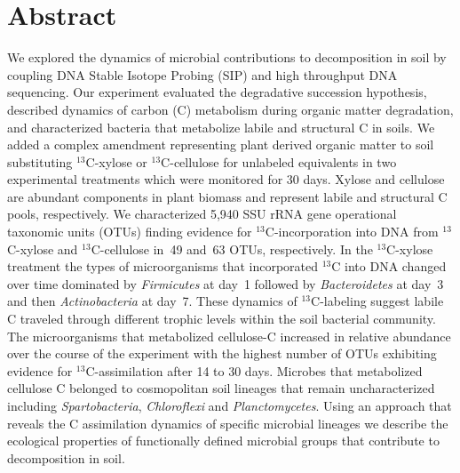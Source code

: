 \section{Abstract} We explored the dynamics of microbial contributions to
decomposition in soil by coupling DNA Stable Isotope Probing (SIP) and high
throughput DNA sequencing. Our experiment evaluated the degradative succession
hypothesis, described dynamics of carbon (C) metabolism during organic matter
degradation, and characterized bacteria that metabolize labile and structural
C in soils. We added a complex amendment representing plant derived organic
matter to soil substituting $^{13}$C-xylose or $^{13}$C-cellulose for unlabeled
equivalents in two experimental treatments which were monitored for 30 days.
Xylose and cellulose are abundant components in plant biomass and represent
labile and structural C pools, respectively. We characterized 5,940 SSU rRNA
gene operational taxonomic units (OTUs) finding evidence for
$^{13}$C-incorporation into DNA from $^{13}$C-xylose and $^{13}$C-cellulose
in~49 and~63 OTUs, respectively. In the $^{13}$C-xylose treatment the types of
microorganisms that incorporated $^{13}$C into DNA changed over time dominated
by \textit{Firmicutes} at day~1 followed by \textit{Bacteroidetes} at day~3 and
then \textit{Actinobacteria} at day~7. These dynamics of $^{13}$C-labeling
suggest labile C traveled through different trophic levels within the soil
bacterial community. The microorganisms that metabolized cellulose-C increased
in relative abundance over the course of the experiment with the highest number
of OTUs exhibiting evidence for $^{13}$C-assimilation after 14 to 30 days.
Microbes that metabolized cellulose C belonged to cosmopolitan soil lineages
that remain uncharacterized including \textit{Spartobacteria},
\textit{Chloroflexi} and \textit{Planctomycetes}. Using an approach that
reveals the C assimilation dynamics of specific microbial lineages we describe
the ecological properties of functionally defined microbial groups that
contribute to decomposition in soil.
